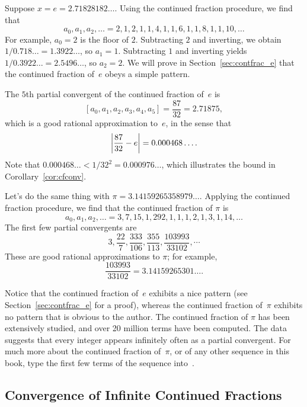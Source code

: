 \begin{example}\label{ex:e_and_pi}
Suppose $x = e = 2.71828182\ldots$.  Using the continued
fraction procedure, we find that
$$
 a_0, a_1, a_2, \ldots = 2,1,2,1,1,4,1,1,6,1,1,8,1,1,10,\ldots
$$
For example,
$a_0=2$ is the floor of $2$.  Subtracting $2$ and inverting,
we obtain
$1/0.718\ldots  = 1.3922\ldots$, so $a_1=1$.  Subtracting $1$
and inverting yields $1/0.3922\ldots = 2.5496\ldots$, so
$a_2=2$.  We will prove in Section~\ref{sec:contfrac_e} that the
continued fraction of~$e$ obeys a simple pattern.

The $5$th partial convergent of the continued fraction of~$e$ is
$$
[a_0,a_1,a_2,a_3,a_4,a_5] = \frac{87}{32} = 2.71875,
$$
which is a good rational approximation to~$e$, in the
sense that $$\left|\frac{87}{32} - e\right| = 0.000468\ldots.$$
Note that $0.000468\ldots < 1/32^2 = 0.000976\ldots$, which illustrates
the bound in Corollary~\ref{cor:cfconv}.

Let's do the same thing with $\pi=3.14159265358979\ldots$.
Applying the continued fraction procedure, we find that
the continued fraction of $\pi$ is
$$
 a_0, a_1, a_2, \ldots  = 3, 7, 15, 1, 292, 1, 1, 1, 2, 1,
3, 1, 14,\ldots$$
The first few partial convergents are
$$
3, \frac{22}{7}, \frac{333}{106}, \frac{355}{113},
  \frac{103993}{33102}, \cdots
$$
These are good
rational approximations to $\pi$; for example,
$$
 \frac{103993}{33102} = 3.14159265301\ldots.
$$

Notice that the continued fraction of~$e$ exhibits a nice pattern (see
Section~\ref{sec:contfrac_e} for a proof), whereas the continued
fraction of~$\pi$ exhibits no pattern that is obvious to the author.
The continued fraction of $\pi$ has been extensively studied, and over
20 million terms have been computed.  The data suggests that every
integer appears infinitely often as a partial convergent.  For much
more about the continued fraction of~$\pi$, or of any other sequence
in this book, type the first few terms of the sequence
into~\cite{sloane}.
\end{example}


\subsection{Convergence of Infinite Continued Fractions}


